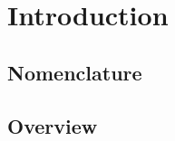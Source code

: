 \chapter{Introduction}\label{chap:introduction}








\lipsum[1-10]

\section{Nomenclature}

\section{Overview}

